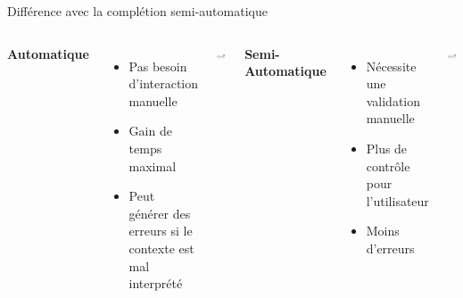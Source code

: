 \begin{frame}{Différence avec la complétion semi-automatique}
	\begin{columns}
		\textbf{Automatique}
		\begin{itemize}
			\item Pas besoin d'interaction manuelle
			\item Gain de temps maximal
			\item Peut générer des erreurs si le contexte est mal interprété
		\end{itemize}
		\includegraphics[width=0.9\textwidth]{images/exemple_clavier_completion_auto.png}
		
		\textbf{Semi-Automatique}
		\begin{itemize}
			\item Nécessite une validation manuelle
			\item Plus de contrôle pour l'utilisateur
			\item Moins d’erreurs
		\end{itemize}
		\includegraphics[width=0.9\textwidth]{images/exemple_clavier_completion_semi.png}
	\end{columns}
\end{frame}

